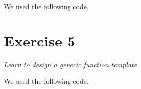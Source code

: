 \documentclass[12pt]{article}
\newcommand{\desc}[1]{\textit{#1} \vspace{1em}}
\begin{document}
We used the following code,






\clearpage

\section*{Exercise 5}
\desc{Learn to design a generic function template}

We used the following code,





\clearpage
\end{document}

